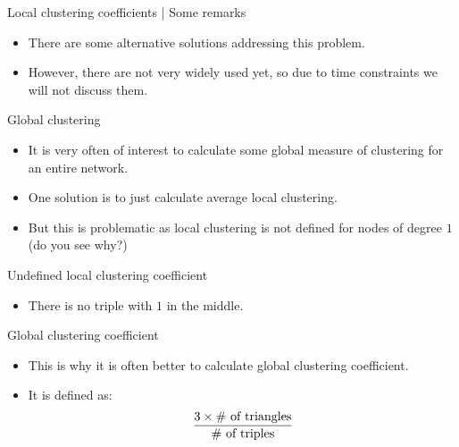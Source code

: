 \documentclass[
    hyperref={colorlinks,linkcolor=blue,urlcolor=blue,citecolor=blue}
]{beamer}
\begin{document}
\begin{frame}{Local clustering coefficients | Some remarks}
\begin{itemize}
    \item<2-> There are some alternative solutions addressing this problem.
    \item<3-> However, there are not very widely used yet, so due to time
    constraints we will not discuss them.
\end{itemize}
\end{frame}

\begin{frame}{Global clustering}
\begin{itemize}
    \item<2-> It is very often of interest to calculate some global measure
    of clustering for an entire network.
    \item<3-> One solution is to just calculate average local clustering.
    \item<4-> But this is problematic as local clustering is not defined
    for nodes of degree $1$ (do you see why?)
\end{itemize}
\end{frame}

\begin{frame}{Undefined local clustering coefficient}
\begin{center}
\end{center}
\pause
\begin{itemize}
    \item There is no triple with $1$ in the middle.
\end{itemize}
\end{frame}

\begin{frame}{Global clustering coefficient}
\begin{itemize}
    \item<2-> This is why it is often better to calculate global
    clustering coefficient.
    \item<3-> It is defined as:
    \[
        \frac{%
            3 \times \text{\# of triangles}
        }{%
            \text{\# of triples}
        }
    \]
\end{itemize}
\end{frame}
\end{document}

